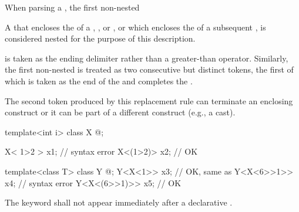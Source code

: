 \pnum
{}%
When parsing a ,
the first non-nested
\tcode{>}
\begin{footnote}
A \tcode{>} that encloses the 
of a , , 
or , or which encloses the 
of a subsequent , is considered nested for the purpose
of this description.
\end{footnote}
is taken as the ending delimiter
rather than a greater-than operator.
Similarly, the first non-nested \tcode{>>} is treated as two
consecutive but distinct \tcode{>} tokens, the first of which is taken
as the end of the  and completes
the .
\begin{note}
The second \tcode{>}
token produced by this replacement rule can terminate an enclosing
 construct or it can be part of a different
construct (e.g., a cast).
\end{note}
\begin{example}
\begin{codeblock}
template<int i> class X { @\commentellip@ };

X< 1>2 > x1;                            // syntax error
X<(1>2)> x2;                            // OK

template<class T> class Y { @\commentellip@ };
Y<X<1>> x3;                             // OK, same as 
Y<X<6>>1>> x4;                          // syntax error
Y<X<(6>>1)>> x5;                        // OK
\end{codeblock}
\end{example}

\pnum
The keyword  shall not appear immediately after
a declarative .


